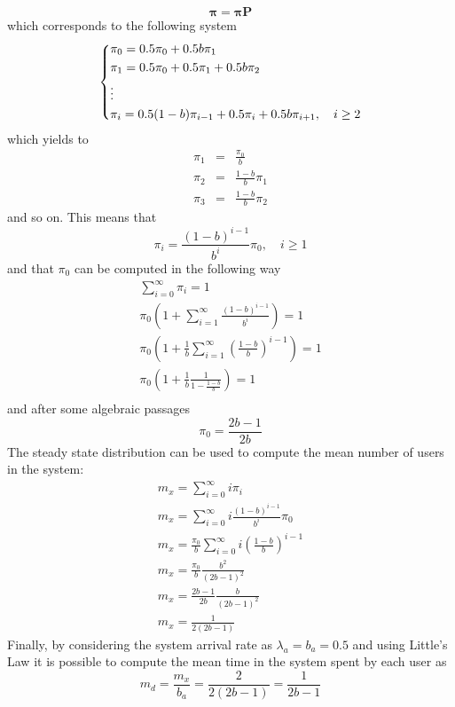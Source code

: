 \documentclass[10pt]{article}
\begin{document}
\begin{equation}
	\boldsymbol{\pi} = \boldsymbol{\pi} \mathbf{P}
\end{equation}
which corresponds to the following system
\begin{equation}
\begin{dcases}
	\pi_0 = 0.5 \pi_0 + 0.5b \pi_1	\\
	\pi_1 = 0.5 \pi_0 + 0.5 \pi_1 + 0.5 b \pi_2	\\
	\vdots	\\
	\pi_i = 0.5(1-b) \pi_{i-1} + 0.5 \pi_i + 0.5b\pi_{i+1}, \quad i \ge 2	\\
\end{dcases}
\end{equation}
which yields to
\begin{eqnarray*}
	\pi_1 & = & \frac{\pi_0}{b} \\
	\pi_2 & = & \frac{1-b}{b} \pi_1 \\
	\pi_3 & = & \frac{1-b}{b} \pi_2
\end{eqnarray*}
and so on. This means that
\begin{equation}
	\pi_i = \frac{(1-b)^{i-1}}{b^i} \pi_0, \quad i \ge 1
\end{equation} 
and that $\pi_0$ can be computed in the following way
\begin{gather*}
	\sum_{i = 0}^{\infty} \pi_i = 1 \\
	\pi_0 \left( 1 + \sum_{i = 1}^{\infty} \frac{(1-b)^{i-1}}{b^i} \right) = 1 \\
	\pi_0 \left( 1 + \frac{1}{b}\sum_{i = 1}^{\infty} \left(\frac{1-b}{b}\right)^{i-1} \right) = 1 \\
	\pi_0 \left( 1 + \frac{1}{b} \frac{1}{1-\frac{1-b}{b}} \right) = 1 \\
\end{gather*}
and after some algebraic passages 
\begin{equation}
	\pi_0 = \frac{2b -1}{2b}
\end{equation}
The steady state distribution can be used to compute the mean number of users in the system:
\begin{gather*}
	m_x = \sum_{i = 0}^{\infty} i \pi_i \\
	m_x = \sum_{i = 0}^{\infty} i \frac{(1-b)^{i-1}}{b^i} \pi_0 \\
	m_x = \frac{\pi_0}{b} \sum_{i = 0}^{\infty} i \left( \frac{1-b}{b} \right)^{i-1} \\
	m_x = \frac{\pi_0}{b} \frac{b^2}{(2b -1)^2} \\
	m_x = \frac{2b -1}{2b} \frac{b}{(2b -1)^2} \\
	m_x = \frac{1}{2(2b-1)}
\end{gather*}
Finally, by considering the system arrival rate as $\lambda_a = b_a = 0.5$ and using Little's Law it is possible to compute the mean time in the system spent by each user as
\begin{equation}
	m_d = \frac{m_x}{b_a} = \frac{2}{2(2b-1)} = \frac{1}{2b-1}
\end{equation}
\end{document}

